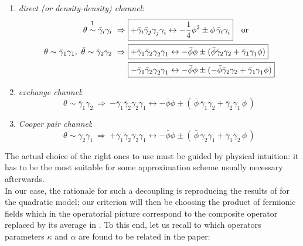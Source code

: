 \documentclass[a4paper,11pt, english]{article}
\theoremstyle{remark}
\begin{document}
\begin{enumerate}
 \item \textit{direct (or density-density) channel}: 
 \begin{align*} \theta \overset{\footnotemark}{\sim} \bar{\gamma}_i\gamma_i \ \Rightarrow\ \Aboxed{&+\bar{\gamma}_i\bar{\gamma}_j\gamma^{ }_j\gamma_i^{ } \leftrightarrow -\frac{1}{4}\phi^2 \pm \phi\,\bar{\gamma}_i\gamma_i^{ }}\ \ \ \text{or  }\\ 
 \theta\sim  \bar{\gamma}_1\gamma_1,\ \bar{\theta}\sim\bar\gamma_2\gamma_2\ \Rightarrow\ \Aboxed{&+\bar{\gamma}_1\bar{\gamma}_2\gamma^{ }_2\gamma_1^{ } \leftrightarrow -\bar{\phi}\phi \pm (\bar{\phi}\bar\gamma_2\gamma_2 +\bar{\gamma}_1\gamma_1^{ }\phi)}\\
 \Aboxed{&-\bar{\gamma}_1\bar{\gamma}_2\gamma^{ }_2\gamma_1^{ } \leftrightarrow -\bar{\phi}\phi \pm (-\bar{\phi}\bar\gamma_2\gamma_2 +\bar{\gamma}_1\gamma_1^{ }\phi)}\end{align*}
 \item \textit{exchange channel}: 
 \begin{equation*}  \theta \sim \bar{\gamma}_1\gamma_2 \ \Rightarrow\ \boxed{-\bar{\gamma}_1\bar{\gamma}_2\gamma^{ }_2\gamma_1^{ } \leftrightarrow -\bar{\phi}\phi \pm (\,\bar{\phi}\,\bar{\gamma}_1\gamma_2^{ } + \bar{\gamma}_2\gamma_1^{ }\,\phi\,) } \end{equation*}
 \item \textit{Cooper pair channel}: 
 \begin{equation*}  \theta \sim \gamma_2\gamma_1 \ \Rightarrow\ \boxed{+\bar{\gamma}_1\bar{\gamma}_2\gamma^{ }_2\gamma_1^{ } \leftrightarrow -\bar{\phi}\phi \pm (\,\bar{\phi}\,\gamma_2\gamma_1 + \bar{\gamma}_1\bar{\gamma}_2\,\phi\,)}\end{equation*}
\end{enumerate}
The actual choice of the right ones to use must be guided by physical intuition: it has to be the most suitable for some approximation scheme usually necessary afterwards.\\
In our case, the rationale for such a decoupling is reproducing the results of \cite{Bardyn2013} for the quadratic model; our criterion will then be choosing the product of fermionic fields which in the operatorial picture correspond to the composite operator replaced by its average in \cite{Bardyn2013}. To this end, let us recall to which operators parameters $\kappa$ and $\alpha$ are found to be related in the paper: 
\end{document}
